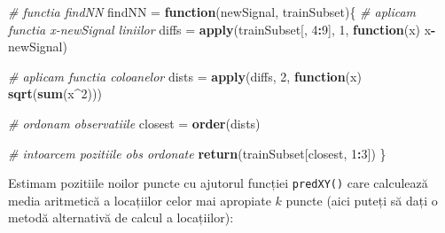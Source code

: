 \documentclass[]{article}
\newenvironment{Shaded}{\begin{snugshade}}{\end{snugshade}}
\newcommand{\KeywordTok}[1]{\textcolor[rgb]{0.13,0.29,0.53}{\textbf{#1}}}
\newcommand{\DecValTok}[1]{\textcolor[rgb]{0.00,0.00,0.81}{#1}}
\newcommand{\StringTok}[1]{\textcolor[rgb]{0.31,0.60,0.02}{#1}}
\newcommand{\CommentTok}[1]{\textcolor[rgb]{0.56,0.35,0.01}{\textit{#1}}}
\newcommand{\ControlFlowTok}[1]{\textcolor[rgb]{0.13,0.29,0.53}{\textbf{#1}}}
\newcommand{\OperatorTok}[1]{\textcolor[rgb]{0.81,0.36,0.00}{\textbf{#1}}}
\newcommand{\NormalTok}[1]{#1}
\begin{document}
\begin{Shaded}
\begin{Highlighting}[]
\CommentTok{# functia findNN}
\NormalTok{findNN =}\StringTok{ }\ControlFlowTok{function}\NormalTok{(newSignal, trainSubset)\{}
  \CommentTok{# aplicam functia x-newSignal liniilor }
\NormalTok{  diffs =}\StringTok{ }\KeywordTok{apply}\NormalTok{(trainSubset[, }\DecValTok{4}\OperatorTok{:}\DecValTok{9}\NormalTok{], }\DecValTok{1}\NormalTok{, }\ControlFlowTok{function}\NormalTok{(x) x}\OperatorTok{-}\NormalTok{newSignal)}
  
  \CommentTok{# aplicam functia coloanelor }
\NormalTok{  dists =}\StringTok{ }\KeywordTok{apply}\NormalTok{(diffs, }\DecValTok{2}\NormalTok{, }\ControlFlowTok{function}\NormalTok{(x) }\KeywordTok{sqrt}\NormalTok{(}\KeywordTok{sum}\NormalTok{(x}\OperatorTok{^}\DecValTok{2}\NormalTok{)))}
  
  \CommentTok{# ordonam observatiile}
\NormalTok{  closest =}\StringTok{ }\KeywordTok{order}\NormalTok{(dists)}
  
  \CommentTok{# intoarcem pozitiile obs ordonate}
  \KeywordTok{return}\NormalTok{(trainSubset[closest, }\DecValTok{1}\OperatorTok{:}\DecValTok{3}\NormalTok{])}
\NormalTok{\}}
\end{Highlighting}
\end{Shaded}

Estimam pozitiile noilor puncte cu ajutorul funcției \texttt{predXY()}
care calculează media aritmetică a locațiilor celor mai apropiate \(k\)
puncte (aici puteți să dați o metodă alternativă de calcul a
locațiilor):
\end{document}
